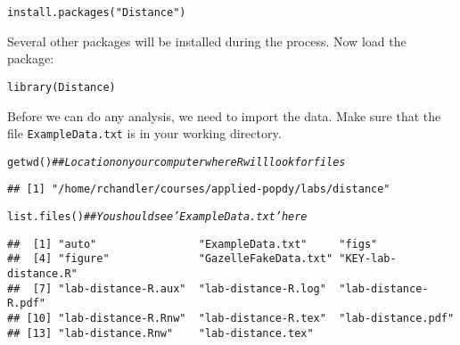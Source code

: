 \documentclass[12pt]{article}\usepackage[]{graphicx}\usepackage[]{color}
\makeatletter
\newcommand{\hlstr}[1]{\textcolor[rgb]{0.749,0.012,0.012}{#1}}%
\newcommand{\hlcom}[1]{\textcolor[rgb]{0.514,0.506,0.514}{\textit{#1}}}%
\newcommand{\hlstd}[1]{\textcolor[rgb]{0,0,0}{#1}}%
\newcommand{\hlkwd}[1]{\textcolor[rgb]{0.004,0.004,0.506}{#1}}%
\newenvironment{kframe}{%
 \def\at@end@of@kframe{}%
 \ifinner\ifhmode%
  \def\at@end@of@kframe{\end{minipage}}%
  \begin{minipage}{\columnwidth}%
 \fi\fi%
 \def\FrameCommand##1{\hskip\@totalleftmargin \hskip-\fboxsep
 \colorbox{shadecolor}{##1}\hskip-\fboxsep
     \hskip-\linewidth \hskip-\@totalleftmargin \hskip\columnwidth}%
 \MakeFramed {\advance\hsize-\width
   \@totalleftmargin\z@ \linewidth\hsize
   \@setminipage}}%
 {\par\unskip\endMakeFramed%
 \at@end@of@kframe}
\newenvironment{knitrout}{}{} %
\makeatother
\begin{document}
\begin{knitrout}
\color{fgcolor}\begin{kframe}
\begin{alltt}
\hlkwd{install.packages}\hlstd{(}\hlstr{"Distance"}\hlstd{)}
\end{alltt}
\end{kframe}
\end{knitrout}

Several other packages will be installed during the process. Now
load the package: 

\begin{knitrout}
\color{fgcolor}\begin{kframe}
\begin{alltt}
\hlkwd{library}\hlstd{(Distance)}
\end{alltt}
\end{kframe}
\end{knitrout}

Before we can do any analysis, we need to import the 
data. Make sure that the file \texttt{ExampleData.txt} is in your
working directory.

\begin{knitrout}
\color{fgcolor}\begin{kframe}
\begin{alltt}
\hlkwd{getwd}\hlstd{()}       \hlcom{## Location on your computer where R will look for files}
\end{alltt}
\begin{verbatim}
## [1] "/home/rchandler/courses/applied-popdy/labs/distance"
\end{verbatim}
\begin{alltt}
\hlkwd{list.files}\hlstd{()}  \hlcom{## You should see 'ExampleData.txt' here}
\end{alltt}
\begin{verbatim}
##  [1] "auto"                "ExampleData.txt"     "figs"               
##  [4] "figure"              "GazelleFakeData.txt" "KEY-lab-distance.R" 
##  [7] "lab-distance-R.aux"  "lab-distance-R.log"  "lab-distance-R.pdf" 
## [10] "lab-distance-R.Rnw"  "lab-distance-R.tex"  "lab-distance.pdf"   
## [13] "lab-distance.Rnw"    "lab-distance.tex"
\end{verbatim}
\end{kframe}
\end{knitrout}
\end{document}
